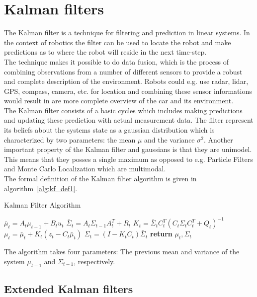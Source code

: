 
\section{Kalman filters}

The Kalman filter is a technique for filtering and prediction in linear systems. In the context of robotics the filter can be used to locate the robot and make predictions as to where the robot will reside in the next time-step.\\

The technique makes it possible to do data fusion, which is the process of combining observations from a number of different sensors to provide a robust and complete description of the environment. Robots could e.g. use radar, lidar, GPS, compass, camera, etc. for location and combining these sensor informations would result in are more complete overview of the car and its environment.\\

The Kalman filter consists of a basic cycles which includes making predictions and updating these prediction with actual measurement data. The filter represent its beliefs about the systems state as a gaussian distribution which is characterized by two parameters: the mean $\mu$ and the variance $\sigma^2$. Another important property of the Kalman filter and gaussians is that they are unimodel. This means that they posses a single maximum as opposed to e.g. Particle Filters and Monte Carlo Localization which are multimodal.\\

The formal definition of the Kalman filter algorithm is given in algorithm~\ref{alg:kf_def1}.

\begin{algorithm}[H]
\caption{Kalman Filter Algorithm}
\label{alg:kf_def1}
\begin{algorithmic}[1]
   \State $\bar\mu_{t} = A_{t}\mu_{t-1} + B_{t}u_{t}$%
   \State $\bar\Sigma_{t} = A_{t}\Sigma_{t-1}A_{t}^T + R_{t}$
   \State $K_{t} = \bar\Sigma_{t}C_{t}^T(C_{t}\Sigma_{t}C_{t}^T+Q_{t})^{-1}$
   \State $\mu_{t} = \bar\mu_{t} + K_{t}(z_{t} - C_{t}\bar\mu_{t})$
   \State $\Sigma_{t} = (I - K_{t}C_{t})\bar\Sigma_{t}$
   \State \textbf{return} $\mu_{t}, \Sigma_{t}$
\EndProcedure
\end{algorithmic}
\end{algorithm}

The algorithm takes four parameters: The previous mean and variance of the system $\mu_{t-1}$ and $\Sigma_{t-1}$, respectively.

\subsection{Extended Kalman filters}